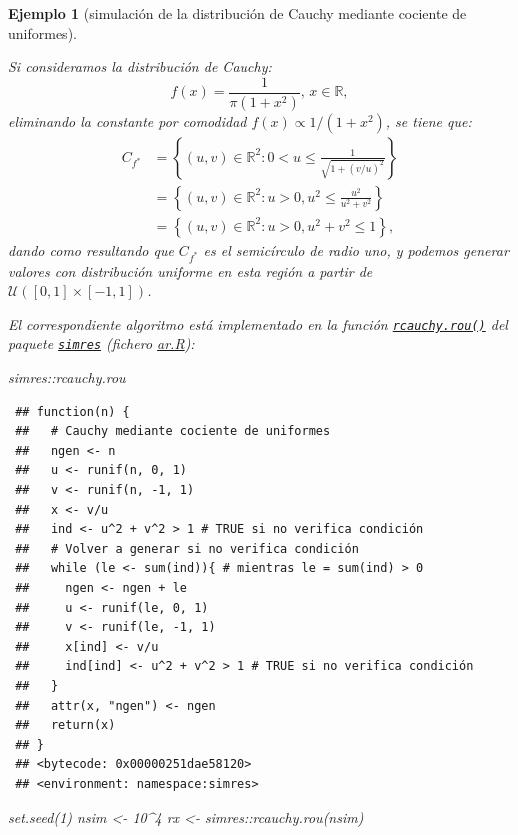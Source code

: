 \documentclass[
]{book}
\newenvironment{Shaded}{\begin{snugshade}}{\end{snugshade}}
\newcommand{\DecValTok}[1]{\textcolor[rgb]{0.00,0.00,0.81}{#1}}
\newcommand{\FunctionTok}[1]{\textcolor[rgb]{0.00,0.00,0.00}{#1}}
\newcommand{\NormalTok}[1]{#1}
\newcommand{\OtherTok}[1]{\textcolor[rgb]{0.56,0.35,0.01}{#1}}
\newcommand{\SpecialCharTok}[1]{\textcolor[rgb]{0.00,0.00,0.00}{#1}}
\theoremstyle{break}
\newtheorem{example}{Ejemplo}[chapter]
\theoremstyle{nonumberplain}
\begin{document}
\begin{example}[simulación de la distribución de Cauchy mediante cociente de uniformes]
\protect\hypertarget{exm:cauchy-rou}{}\label{exm:cauchy-rou}

Si consideramos la distribución de Cauchy:
\[f(x) = \frac{1}{\pi (1 + x^2)} \text{, } x\in \mathbb{R},\]
eliminando la constante por comodidad \(f(x) \propto 1/(1 + x^2)\), se tiene que:
\[\begin{aligned}
C_{f^{\ast}} & = \left\{ (u, v) \in \mathbb{R}^{2} : 0 <u \leq \frac{1}{\sqrt{1 + (v/u)^2}}  \right\} \\
& = \left\{ (u, v) \in \mathbb{R}^{2} : u > 0, u^2 \leq \frac{u^2}{u^2 + v^2}  \right\} \\
& = \left\{ (u, v) \in \mathbb{R}^{2} : u > 0, u^2 + v^2 \leq 1  \right\}, 
\end{aligned}\]
dando como resultando que \(C_{f^{\ast}}\) es el semicírculo de radio uno, y podemos generar valores con distribución uniforme en esta región a partir de \(\mathcal{U}\left([0,1]\times[-1,1] \right)\).

El correspondiente algoritmo está implementado en la función \href{https://rubenfcasal.github.io/simres/reference/rcauchy.rou.html}{\texttt{rcauchy.rou()}} del paquete \href{https://rubenfcasal.github.io/simres}{\texttt{simres}} (fichero \href{R/ar.R}{\emph{ar.R}}):

\begin{Shaded}
\begin{Highlighting}[]
\NormalTok{simres}\SpecialCharTok{::}\NormalTok{rcauchy.rou}
\end{Highlighting}
\end{Shaded}

\begin{verbatim}
 ## function(n) {
 ##   # Cauchy mediante cociente de uniformes
 ##   ngen <- n
 ##   u <- runif(n, 0, 1)
 ##   v <- runif(n, -1, 1)
 ##   x <- v/u
 ##   ind <- u^2 + v^2 > 1 # TRUE si no verifica condición
 ##   # Volver a generar si no verifica condición
 ##   while (le <- sum(ind)){ # mientras le = sum(ind) > 0
 ##     ngen <- ngen + le
 ##     u <- runif(le, 0, 1)
 ##     v <- runif(le, -1, 1)
 ##     x[ind] <- v/u
 ##     ind[ind] <- u^2 + v^2 > 1 # TRUE si no verifica condición
 ##   }
 ##   attr(x, "ngen") <- ngen
 ##   return(x)
 ## }
 ## <bytecode: 0x00000251dae58120>
 ## <environment: namespace:simres>
\end{verbatim}

\begin{Shaded}
\begin{Highlighting}[]
\FunctionTok{set.seed}\NormalTok{(}\DecValTok{1}\NormalTok{)}
\NormalTok{nsim }\OtherTok{\textless{}{-}} \DecValTok{10}\SpecialCharTok{\^{}}\DecValTok{4}
\NormalTok{rx }\OtherTok{\textless{}{-}}\NormalTok{ simres}\SpecialCharTok{::}\FunctionTok{rcauchy.rou}\NormalTok{(nsim)}


\end{Highlighting}
\end{Shaded}
\end{example}
\end{document}
